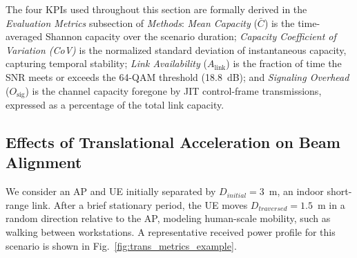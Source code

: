 \documentclass[fleqn,10pt]{wlscirep}
\newcommand{\rev}[1]{{\color{revblue}#1}}
\begin{document}
\rev{The four KPIs used throughout this section are formally derived in the \textit{Evaluation Metrics} subsection of \textit{Methods}: \emph{Mean Capacity} ($\bar{C}$) is the time-averaged Shannon capacity over the scenario duration; \emph{Capacity Coefficient of Variation (CoV)} is the normalized standard deviation of instantaneous capacity, capturing temporal stability; \emph{Link Availability} ($A_{\text{link}}$) is the fraction of time the SNR meets or exceeds the 64-QAM threshold (\SI{18.8}{\deci\bel}); and \emph{Signaling Overhead} ($O_{\text{sig}}$) is the channel capacity foregone by JIT control-frame transmissions, expressed as a percentage of the total link capacity.}



\subsection*{Effects of Translational Acceleration on Beam Alignment}

We consider an AP and UE initially separated by $D_{initial} = 3$~m, an indoor short-range link\cite{9013236}. After a brief stationary period, the UE moves $D_{traversed} = 1.5$~m in a random direction relative to the AP, modeling human-scale mobility, such as walking between workstations. A representative received power profile for this scenario is shown in Fig.~\ref{fig:trans_metrics_example}.
\end{document}
